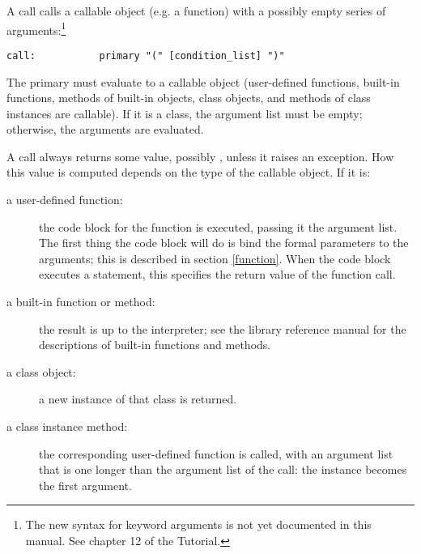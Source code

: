 A call calls a callable object (e.g. a function) with a possibly empty
series of arguments:\footnote{The new syntax for keyword arguments is
not yet documented in this manual.  See chapter 12 of the Tutorial.}

\begin{verbatim}
call:           primary "(" [condition_list] ")"
\end{verbatim}

The primary must evaluate to a callable object (user-defined
functions, built-in functions, methods of built-in objects, class
objects, and methods of class instances are callable).  If it is a
class, the argument list must be empty; otherwise, the arguments are
evaluated.

A call always returns some value, possibly \verb@None@, unless it
raises an exception.  How this value is computed depends on the type
of the callable object.  If it is:

\begin{description}

\item[a user-defined function:] the code block for the function is
executed, passing it the argument list.  The first thing the code
block will do is bind the formal parameters to the arguments; this is
described in section \ref{function}.  When the code block executes a
\verb@return@ statement, this specifies the return value of the
function call.

\item[a built-in function or method:] the result is up to the
interpreter; see the library reference manual for the descriptions of
built-in functions and methods.

\item[a class object:] a new instance of that class is returned.

\item[a class instance method:] the corresponding user-defined
function is called, with an argument list that is one longer than the
argument list of the call: the instance becomes the first argument.

\end{description}

